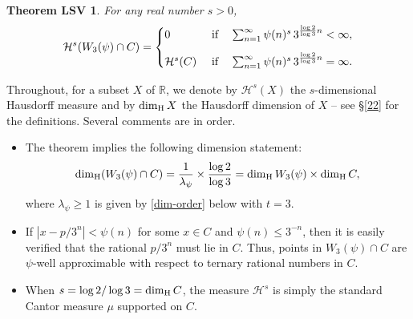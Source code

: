 \documentclass[12pt]{article}
\newtheorem*{lthm}{Theorem LSV}
\theoremstyle{definition}
\theoremstyle{remark}
\newcommand{\red}[1]{\textcolor[rgb]{1.00,0.00,0.00}{#1}}
\begin{document}
\begin{lthm}
For any real number $s> 0 $,
\begin{equation}\label{19}
\begin{aligned}
\mathcal{H}^{s}(W_{3}(\psi)\cap C)=\begin{cases} 0  \ &{\rm if}\quad \sum_{n=1}^{\infty}\psi(n)^{s} \, 3^{\frac{\log 2}{\log 3}n}<\infty, \\[2ex]
\mathcal{H}^{s}(C) \ &{\rm if}\quad \sum_{n=1}^{\infty}\psi(n)^{s}  \, 3^{\frac{\log 2}{\log 3}n}=\infty. \end{cases}
\end{aligned}
\end{equation}
\end{lthm}

\noindent Throughout, for  a subset $X$ of $\mathbb{R}$,  we denote by  $\mathcal{H}^{s}(X)$ the $s$-dimensional Hausdorff measure and by  $ \dim_{\rm H} X$  the Hausdorff dimension of  $X$  -- see \S \ref{22} for the definitions.   Several comments are in order.
\begin{itemize}
  \item[$\bullet$]    The  theorem implies the following dimension statement:
\begin{equation}  \label{Cdimstate}
\dim_{\rm H}(W_{3}(\psi)\cap C)=  \frac{1}{\lambda_{\psi}} \times \frac{\log 2}{\log 3} =  \dim_{\rm H}W_{3}(\psi)   \times \dim_{\rm H}C ,
\end{equation}
where   $\lambda_\psi \ge 1 $ is given by  \eqref{dim-order} below with $t=3$.
  \item[$\bullet$]  If $|x-
p/3^n  |<\psi(n) $ for some $ x \in C $ and $\psi(n)\leq 3^{-n}  $, then it is easily verified that  the rational  $p/3^n$ must lie in $C$.  Thus, points in $W_{3}(\psi)\cap C$ are $\psi$-well approximable  with respect to ternary rational numbers in $C$.
   \item[$\bullet$] When $s = \log2/\log 3 = \dim_{\rm H}C$, the measure $\mathcal{H}^{s}$ is simply the standard Cantor measure $\mu$ supported on $C$.
\end{itemize}
%
\end{document}
